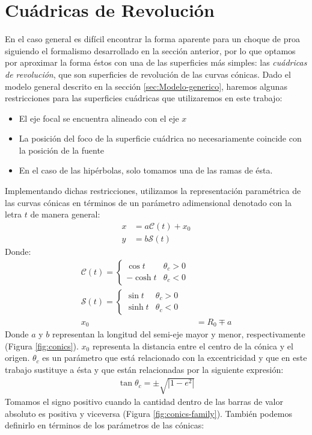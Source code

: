\section{Cuádricas de Revolución}

\newcommand\Sin{\ensuremath{\mathcal{S}}}
\newcommand\Cos{\ensuremath{\mathcal{C}}}
\newcommand\Cot{\ensuremath{\mathcal{T}}}


En el caso general es difícil encontrar la forma aparente para un choque de
proa siguiendo el formalismo desarrollado en la sección anterior, por lo que
optamos por aproximar la forma éstos con una de las superficies más simples:
las \textit{cuádricas de revolución}, que son superficies de revolución de
las curvas cónicas. Dado el modelo general descrito en la sección
\ref{sec:Modelo-generico}, haremos algunas restricciones para las superficies
cuádricas que utilizaremos en este trabajo:
\begin{itemize}
  \item El eje focal se encuentra alineado con el eje $x$
  \item La posición del foco de la superficie cuádrica no necesariamente coincide
    con la posición de la fuente
  \item En el caso de las hipérbolas, solo tomamos una de las ramas de ésta.
\end{itemize}
Implementando dichas restricciones, utilizamos la representación paramétrica de
las curvas cónicas en términos de un parámetro adimensional denotado con la letra
$t$ de manera general:
\begin{align}
  x &= a\Cos(t) + x_0\\
  y &= b\Sin(t) 
\end{align}
Donde:
\begin{align}
  \Cos(t) =\left\lbrace
  \begin{array}{lr}
    \cos{t} & \theta_c > 0\\
    -\cosh{t} & \theta_c < 0        
  \end{array}\right. \\
  \Sin(t) = \left\lbrace
  \begin{array}{lr}
    \sin{t} & \theta_c > 0\\
    \sinh{t}  & \theta_c < 0
  \end{array} \right. \\
  x_0 &= R_0 \mp a \label{eq:x0} 
\end{align}
Donde $a$ y $b$ representan la longitud del semi-eje mayor y menor, respectivamente (Figura \ref{fig:conics}).
$x_0$ representa la distancia entre el centro de la cónica y el origen. 
$\theta_c$ es un parámetro que está relacionado con la excentricidad y que en este
trabajo sustituye a ésta y que están relacionadas por la siguiente expresión:
\begin{align}
  \tan\theta_c = \pm\sqrt{\left|1-e^2\right|}
\end{align}
Tomamos el signo positivo cuando la cantidad dentro de las barras de valor absoluto es
positiva y viceversa (Figura \ref{fig:conics-family}). También podemos definirlo en
términos de los parámetros de las cónicas:

